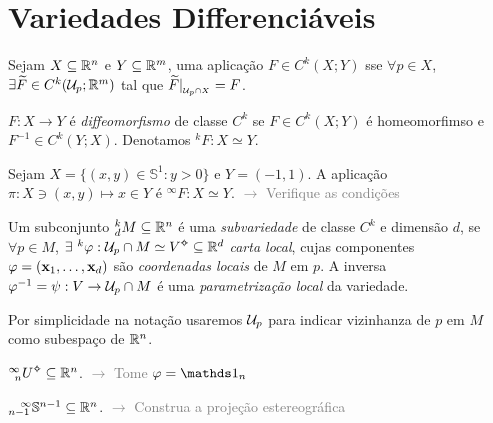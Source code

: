 \section{Variedades Differenciáveis}

\begin{definition}
    Sejam \(X\subseteq \mathbb{R}^n\) e \(Y\subseteq \mathbb{R}^m\), uma aplicação \(F\in C^k(X;Y)\) sse \(\forall p \in X\), \(\exists \widetilde{F} \in C^k(\mathcal{U}_p; \mathbb{R}^m)\) tal que \( \widetilde{F}|_{_{\mathcal{U}_p \cap X}} = F\).    
\end{definition}


\begin{definition}
    \(F: X \to Y\) é \emph{diffeomorfismo} de classe \(C^k\) se \(F\in C^k(X;Y)\) é homeomorfimso e \(F^{-1}\in C^k(Y;X)\). Denotamos \(^k F : X \simeq Y \). 
\end{definition}
\begin{example}
    Sejam \(X= \{(x,y) \in \mathbb{S}^1: y > 0 \}\) e \(Y = (-1,1)\). A aplicação \(\pi: X \ni (x,y) \mapsto x \in Y\) é \(^\infty F: X\simeq Y \). \textcolor{gray}{\(\rightarrow\) Verifique as condições}
\end{example}
\begin{definition}
    Um subconjunto \(^k_d M \subseteq \mathbb{R}^n\) é uma \emph{subvariedade} de classe \(C^k\) e dimensão \(d\), se  \(\forall p \in M \), \(\exists\ ^k \varphi: \U_p \cap M \simeq V\ab \subseteq \R^d\) \emph{carta local}, cujas componentes \(\varphi = (\textbf{x}_1, \ldots, \textbf{x}_d)\) são \emph{coordenadas locais} de \(M\) em \(p\). A inversa \(\varphi^{-1} = \psi : V \to \mathcal{U}_p \cap M \) é uma \emph{parametrização local} da variedade. 
\end{definition}

\begin{note}
    Por simplicidade na notação usaremos \(\mathcal{U}_p\) para indicar vizinhanza de \(p\) em \(M\) como subespaço de \(\mathbb{R}^n\). 
\end{note}

\begin{example}
    \(^{\infty}_{\hspace{0.15cm}n} U\ab\subseteq \R^n\). \textcolor{gray}{\(\rightarrow \) Tome \(\varphi = \id_n\)}
\end{example}
\begin{example}
    \(^{\hspace{0.3cm}\infty}_{n-1}\mathbb{S}^{n-1} \subseteq \mathbb{R}^n\). \textcolor{gray}{\(\rightarrow\) Construa a projeção estereográfica} 
\end{example}

